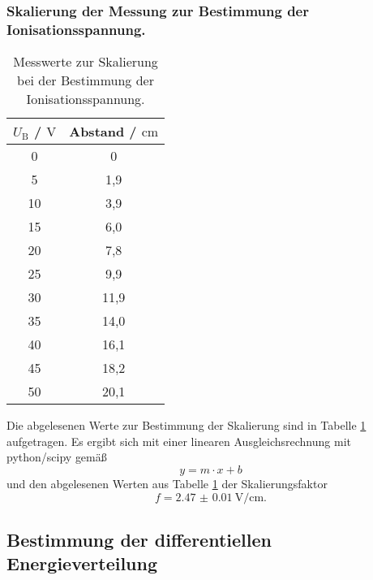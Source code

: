 \subsubsection{Skalierung der Messung zur Bestimmung der Ionisationsspannung.}
\begin{table}
	\centering
	\caption{Messwerte zur Skalierung bei der Bestimmung der Ionisationsspannung.}
	\label{tab:c}
	\begin{tabular}{cc}
		\toprule
		$U_{\mathrm{B}}$ / $\si{\volt}$ & Abstand / $\si{\centi\meter}$ \\
		\midrule
		0 & 0 \\
		5 & 1,9 \\
		10 & 3,9 \\
		15 & 6,0 \\
		20 & 7,8 \\
		25 & 9,9 \\
		30 & 11,9 \\
		35 & 14,0 \\
		40 & 16,1 \\
		45 & 18,2 \\
		50 & 20,1 \\
		\bottomrule
	\end{tabular}
\end{table}
Die abgelesenen Werte zur Bestimmung der Skalierung sind in Tabelle \ref{tab:c} aufgetragen.
Es ergibt sich mit einer linearen Ausgleichsrechnung mit python/scipy \cite{scipy} gemäß
\begin{equation*}
	y = m \cdot x + b
\end{equation*}
und den abgelesenen Werten aus Tabelle \ref{tab:c} der Skalierungsfaktor
\begin{equation*}
	f = \SI{2.47(1)}{\volt\per\centi\meter} \mathrm{.}
\end{equation*}
\FloatBarrier
\subsection{Bestimmung der differentiellen Energieverteilung}
